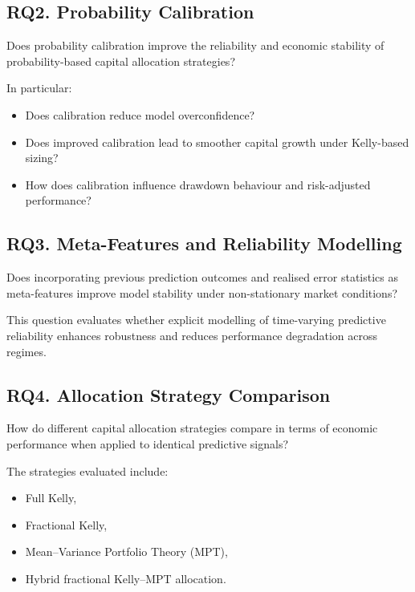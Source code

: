\documentclass{l4proj}
\begin{document}
\subsection*{RQ2. Probability Calibration}

Does probability calibration improve the reliability and economic stability of probability-based capital allocation strategies?

In particular:

\begin{itemize}
    \item Does calibration reduce model overconfidence?
    \item Does improved calibration lead to smoother capital growth under Kelly-based sizing?
    \item How does calibration influence drawdown behaviour and risk-adjusted performance?
\end{itemize}

\subsection*{RQ3. Meta-Features and Reliability Modelling}

Does incorporating previous prediction outcomes and realised error statistics as meta-features improve model stability under non-stationary market conditions?

This question evaluates whether explicit modelling of time-varying predictive reliability enhances robustness and reduces performance degradation across regimes.

\subsection*{RQ4. Allocation Strategy Comparison}

How do different capital allocation strategies compare in terms of economic performance when applied to identical predictive signals?

The strategies evaluated include:

\begin{itemize}
    \item Full Kelly,
    \item Fractional Kelly,
    \item Mean–Variance Portfolio Theory (MPT),
    \item Hybrid fractional Kelly–MPT allocation.
\end{itemize}
\end{document}
